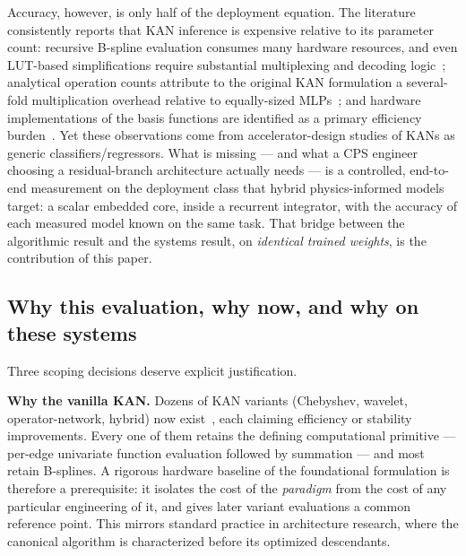 \documentclass[conference]{IEEEtran}
\begin{document}
Accuracy, however, is only half of the deployment equation. The literature
consistently reports that KAN inference is expensive relative to its parameter
count: recursive B-spline evaluation consumes many hardware resources, and
even LUT-based simplifications require substantial multiplexing and decoding
logic~\cite{huang2025hardware}; analytical operation counts attribute to the
original KAN formulation a several-fold multiplication overhead relative to
equally-sized MLPs~\cite{khalidHW_PLACEHOLDER}; and hardware implementations
of the basis functions are identified as a primary efficiency
burden~\cite{zhangHW_PLACEHOLDER}. Yet these observations come from
accelerator-design studies of KANs as generic classifiers/regressors. What is
missing --- and what a CPS engineer choosing a residual-branch architecture
actually needs --- is a controlled, end-to-end measurement on the deployment
class that hybrid physics-informed models target: a scalar embedded core,
inside a recurrent integrator, with the accuracy of each measured model known
on the same task. That bridge between the algorithmic result and the systems
result, on \emph{identical trained weights}, is the contribution of this
paper.

\subsection{Why this evaluation, why now, and why on these systems}
\label{sec:scope}

Three scoping decisions deserve explicit justification.

\textbf{Why the vanilla KAN.} Dozens of KAN variants (Chebyshev, wavelet,
operator-network, hybrid) now exist~\cite{mostajeran2025scaled,abueidda2025deepokan,zhang2025physics},
each claiming efficiency or stability improvements. Every one of them retains
the defining computational primitive --- per-edge univariate function
evaluation followed by summation --- and most retain B-splines. A rigorous
hardware baseline of the foundational formulation is therefore a prerequisite:
it isolates the cost of the \emph{paradigm} from the cost of any particular
engineering of it, and gives later variant evaluations a common reference
point. This mirrors standard practice in architecture research, where the
canonical algorithm is characterized before its optimized descendants.
\end{document}
